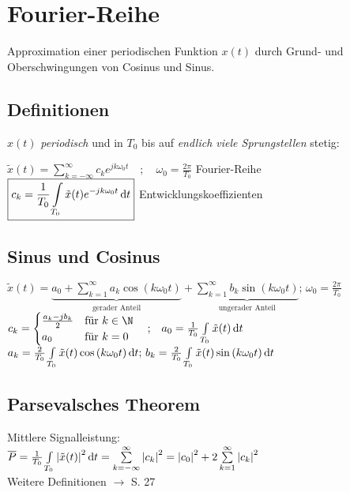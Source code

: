 \documentclass[german]{latex4ei/latex4ei_sheet}
\renewcommand{\diff}{\mathop{}\!\mathrm{\vphantom( d}}
\begin{document}
	\section{Fourier-Reihe}
	\begin{sectionbox}
	Approximation einer periodischen Funktion $x(t)$ durch Grund- und Oberschwingungen von Cosinus und Sinus.
		\subsection*{Definitionen}
		$x(t)$ \emph{periodisch} und in $T_0$ bis auf \emph{endlich viele Sprungstellen} stetig:
		
		$\boxed{
			\tilde{x}(t) = \sum\limits_{k = -\infty}^{\infty}{c_k e^{j k \omega_0 t}}\quad ;\quad \omega_0 = \frac{2\pi}{T_0}
		}$ \hfill Fourier-Reihe\\
		$\boxed{
			c_k = \frac{1}{T_0}\int\limits_{T_0}{\tilde{x}(t) e^{-j k \omega_0 t} \diff t}
		}$ \hfill Entwicklungskoeffizienten
		
		\subsection*{Sinus und Cosinus}
		$\boxed{
			\tilde{x}(t) = \underbrace{a_0 + \sum\limits_{k = 1}^{\infty}{a_k \cos{(k \omega_0 t)}}}_{\text{gerader Anteil}} + \underbrace{\sum\limits_{k = 1}^{\infty}{b_k \sin{(k \omega_0 t)}}}_{\text{ungerader Anteil}} \text{; } \omega_0 = \frac{2 \pi}{T_0}
		}$\\
		$c_k = \begin{cases}
			\frac{a_k - j b_k}{2} & \text{für } k \in \N \\
			a_0 & \text{für } k = 0\\
		\end{cases} \quad \text{;} \quad a_0 = \frac{1}{T_0}\int\limits_{T_0}{\tilde{x}(t) \diff t}$\\
		$a_k = \frac{2}{T_0}\int\limits_{T_0}{\tilde{x}(t) \cos{(k \omega_0 t)} \diff t} \text{; } b_k = \frac{2}{T_0}\int\limits_{T_0}{\tilde{x}(t) \sin{(k \omega_0 t)} \diff t}$
		
		\subsection*{Parsevalsches Theorem}
		Mittlere Signalleistung:\\
		$\overline{P} = \frac{1}{T_0}\int\limits_{T_0}{\abs{\tilde{x}(t)}^2 \diff t} = \sum\limits_{k = -\infty}^{\infty}{\abs{c_k}^2} = \abs{c_0}^2 + 2 \sum\limits_{k = 1}^{\infty}{\abs{c_k}^2}$\\
		Weitere Definitionen $\rightarrow$ S. 27
		

\end{sectionbox}
\end{document}
